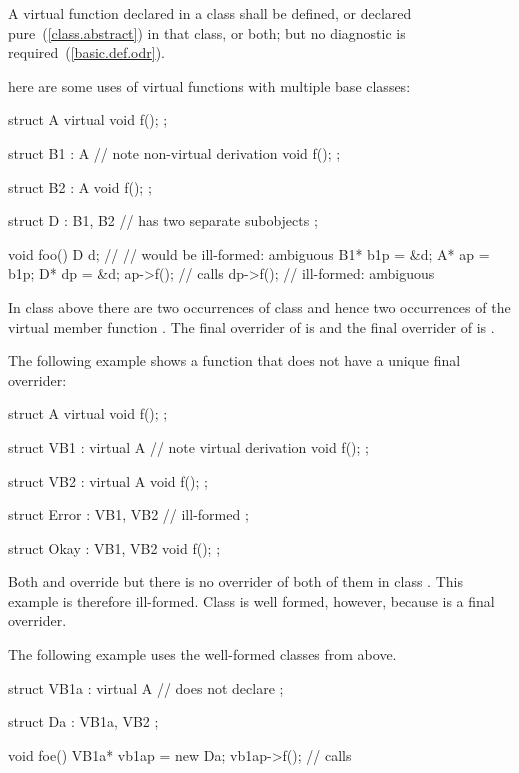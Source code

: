 \pnum
{}%
A virtual function declared in a class shall be defined, or declared
pure~(\ref{class.abstract}) in that class, or both; but no diagnostic is
required~(\ref{basic.def.odr}).
%

\pnum
{}%
\enterexample
here are some uses of virtual functions with multiple base classes:
%
\begin{codeblock}
struct A {
  virtual void f();
};

struct B1 : A {                 // note non-virtual derivation
  void f();
};

struct B2 : A {
  void f();
};

struct D : B1, B2 {             //  has two separate  subobjects
};

void foo() {
  D   d;
//                  // would be ill-formed: ambiguous
  B1*  b1p = &d;
  A*   ap = b1p;
  D*   dp = &d;
  ap->f();                      // calls 
  dp->f();                      // ill-formed: ambiguous
}
\end{codeblock}
In class  above there are two occurrences of class 
and hence two occurrences of the virtual member function .
The final overrider of  is  and the final
overrider of  is .

\pnum
The following example shows a function that does not have a unique final
overrider:
\begin{codeblock}
struct A {
  virtual void f();
};

struct VB1 : virtual A {        // note virtual derivation
  void f();
};

struct VB2 : virtual A {
  void f();
};

struct Error : VB1, VB2 {       // ill-formed
};

struct Okay : VB1, VB2 {
  void f();
};
\end{codeblock}
Both  and  override  but there
is no overrider of both of them in class . This example is
therefore ill-formed. Class  is well formed, however,
because  is a final overrider.

\pnum
The following example uses the well-formed classes from above.
\begin{codeblock}
struct VB1a : virtual A {       // does not declare 
};

struct Da : VB1a, VB2 {
};

void foe() {
  VB1a*  vb1ap = new Da;
  vb1ap->f();                   // calls 
}
\end{codeblock}
\exitexample

